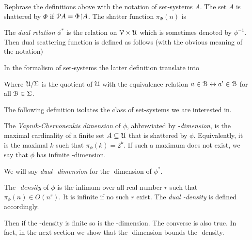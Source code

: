 \documentclass[sputnik.tex]{subfiles}
\begin{document}
Rephrase the definitions above with the notation of set-systems $A$.
The set $A$ is shattered by $\Phi$ if $\P A=\Phi{\restriction} A$.
The shatter function \emph{$\pi_\Phi(n)$\/} is



\separatore

The \emph{dual relation\/} $\phi^*$ is the relation on $\V\times\U$ which is sometimes denoted by $\phi^{-1}$.
Then dual scattering function is defined as follows (with the obvious meaning of the notation) 



In the formalism of set-systems the latter definition translate into
 

Where $\U/\Sigma$ is the quotient of $\U$ with the equivalence relation $a\in\B\iff a'\in\B$ for all $\B\in\Sigma$.


\separatore

The following definition isolates the class of set-systems we are interested in. 

\begin{definition}\label{def_VCdim}
The \emph{Vapnik-Cher\-vo\-nen\-kis dimension\/} of $\phi$, abbreviated by \emph{\vc-dimension}, is the maximal cardinality of a finite set $A\subseteq\U$ that is shattered by $\phi$.
Equivalently, it is the maximal $k$ such that $\pi_\phi(k)=2^k$.
If such a maximum does not exist,
we say that $\phi$ has infinite \vc-dimension.

We will say \emph{dual \vc-dimension\/} for the \vc-dimension of $\phi^*$.

The \emph{\vc-density\/} of $\phi$ is the infimum over all real number $r$ such that $\pi_\phi(n)\in O(n^r)$.
It is infinite if no such $r$ exist.
The  \emph{dual \vc-density\/} is defined accordingly.\QED
\end{definition}


Then if the \vc-density is finite so is the \vc-dimension.
The converse is also true.
In fact, in the next section we show that the \vc-dimension bounds the \vc-density.
\end{document}
